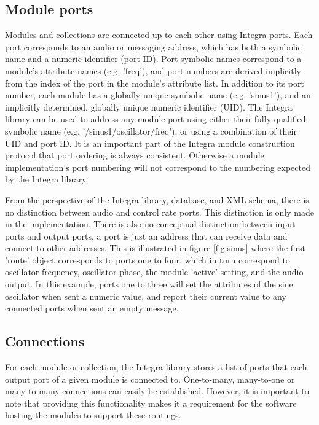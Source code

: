 \subsection{Module ports}\label{subsec:module_ports}

Modules and collections are connected up to each other using Integra
ports. Each port corresponds to an audio or messaging address, which
has both a symbolic name and a numeric identifier (port ID). Port
symbolic names correspond to a module's attribute names (e.g. 'freq'),
and port numbers are derived implicitly from the index of the port in
the module's attribute list. In addition to its port number, each
module has a globally unique symbolic name (e.g. 'sinus1'), and an
implicitly determined, globally unique numeric identifier (UID). The
Integra library can be used to address any module port using either
their fully-qualified symbolic name (e.g. '/sinus1/oscillator/freq'),
or using a combination of their UID and port ID. It is an important
part of the Integra module construction protocol that port ordering is
always consistent. Otherwise a module implementation's port numbering
will not correspond to the numbering expected by the Integra library.

From the perspective of the Integra library, database, and XML schema,
there is no distinction between audio and control rate ports. This
distinction is only made in the implementation. There is also no
conceptual distinction between input ports and output ports, a port is
just an address that can receive data and connect to other addresses.
This is illustrated in figure \ref{fig:sinus} where the first 'route'
object corresponds to ports one to four, which in turn correspond to
oscillator frequency, oscillator phase, the module 'active' setting, and
the audio output. In this example, ports one to three will set the
attributes of the sine oscillator when sent a numeric value, and report
their current value to any connected ports when sent an empty message.

\subsection{Connections}\label{subsec:connections}

For each module or collection, the Integra library stores a list of
ports that each output port of a given module is connected to.
One-to-many, many-to-one or many-to-many connections can easily be
established. However, it is important to note that providing this
functionality makes it a requirement for the software hosting the
modules to support these routings.

